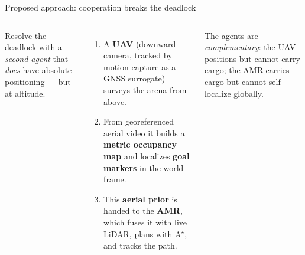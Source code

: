 \documentclass[aspectratio=169,11pt]{beamer}
\begin{document}
\begin{frame}{Proposed approach: cooperation breaks the deadlock}
\begin{columns}[T]
Resolve the deadlock with a \emph{second agent} that \emph{does} have absolute
positioning --- but at altitude.
\begin{enumerate}
  \item A \textbf{UAV} (downward camera, tracked by motion capture as a GNSS
        surrogate) surveys the arena from above.
  \item From georeferenced aerial video it builds a \textbf{metric occupancy map}
        and localizes \textbf{goal markers} in the world frame.
  \item This \textbf{aerial prior} is handed to the \textbf{AMR}, which fuses it
        with live LiDAR, plans with A$^\star$, and tracks the path.
\end{enumerate}
\vspace{0.3em}
The agents are \emph{complementary}: the UAV positions but cannot carry cargo;
the AMR carries cargo but cannot self-localize globally.
\centering
{}
\end{columns}
\end{frame}
\end{document}
